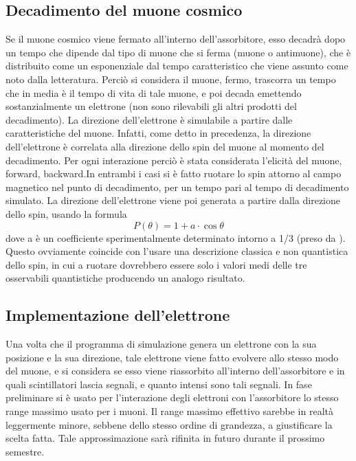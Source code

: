 \subsection{Decadimento del muone cosmico}
Se il muone cosmico viene fermato all'interno dell'assorbitore, esso decadrà dopo un tempo che dipende dal tipo di muone che si ferma (muone o antimuone), che è distribuito
come un esponenziale dal tempo caratteristico che viene assunto come noto dalla letteratura. Perciò si considera il muone, fermo, trascorra un tempo che in media è il tempo
di vita di tale muone, e poi decada emettendo sostanzialmente un elettrone (non sono rilevabili gli altri prodotti del decadimento). La direzione dell'elettrone \`e simulabile a partire dalle caratteristiche del muone. Infatti, come detto in precedenza, la direzione dell'elettrone \`e correlata alla direzione dello spin del muone al momento del decadimento. Per ogni interazione perci\`o \`e stata considerata l'elicit\`a del muone, forward, backward.In entrambi i casi si \`e fatto ruotare lo spin attorno al campo magnetico nel punto di decadimento, per un tempo pari al tempo di decadimento simulato. La direzione dell'elettrone viene poi generata a partire dalla direzione dello spin, usando la formula 
\begin{equation}
	P(\theta) = 1+a\cdot\cos{\theta}
\end{equation}
dove a \`e un coefficiente sperimentalmente determinato intorno a 1/3 (preso da \cite{bib:AJP-Amsler}). Questo ovviamente coincide con l'usare una descrizione classica e non quantistica dello spin, in cui a ruotare dovrebbero essere solo i valori medi delle tre osservabili quantistiche producendo un analogo risultato.

\subsection{Implementazione dell'elettrone}
Una volta che il programma di simulazione genera un elettrone con la sua posizione e la sua direzione, tale elettrone viene fatto evolvere allo stesso modo del muone, e si considera se esso viene riassorbito all'interno dell'assorbitore e in quali scintillatori lascia segnali, e quanto intensi sono tali segnali. In fase preliminare si \`e usato per l'interazione degli elettroni con l'assorbitore lo stesso range massimo usato per i muoni. Il range massimo effettivo sarebbe in realt\`a leggermente minore, sebbene dello stesso ordine di grandezza, a giustificare la scelta fatta. Tale approssimazione sar\`a rifinita in futuro durante il prossimo semestre.

